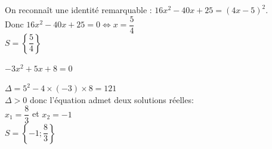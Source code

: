 \documentclass[12pt,a4paper]{article}  %
\begin{document}
\begin{enumMet}
        \begin{corrBox}
            On reconnaît une identité remarquable : $16 x^{2}-40 x+25=(4 x-5)^{2}$.\\
            Donc $16 x^{2}-40 x+25 = 0 \Leftrightarrow x=\dfrac{5}{4}$\\
            $S=\left\{\dfrac{5}{4}\right\}$
        \end{corrBox}
        \item $-3 x^{2}+5 x+8=0$\quad {}\\
        \begin{corrBox}
            $\Delta=5^{2}-4 \times(-3) \times 8=121$\\
            $\Delta>0$ donc l'équation admet deux solutions réelles:\\ $x_{1}=\dfrac{8}{3}$ et $x_{2}=-1$\\
            $S=\left\{-1;\dfrac{8}{3}\right\}$
        \end{corrBox}
    \end{enumMet}
\end{document}
